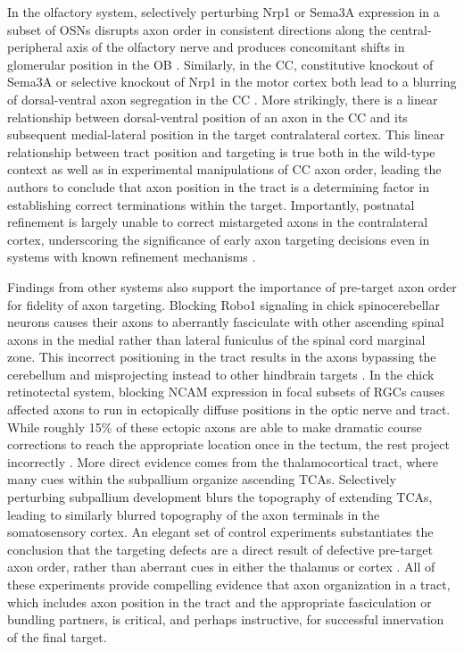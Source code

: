 In the olfactory system, selectively perturbing Nrp1 or Sema3A expression in a subset of OSNs disrupts axon order in consistent directions along the central-peripheral axis of the olfactory nerve and produces concomitant shifts in glomerular position in the OB \cite{imai2009pre}.
Similarly, in the CC, constitutive knockout of Sema3A or selective knockout of Nrp1 in the motor cortex both lead to a blurring of dorsal-ventral axon segregation in the CC \cite{zhou2013axon}.
More strikingly, there is a linear relationship between dorsal-ventral position of an axon in the CC and its subsequent medial-lateral position in the target contralateral cortex.
This linear relationship between tract position and targeting is true both in the wild-type context as well as in experimental manipulations of CC axon order, leading the authors to conclude that axon position in the tract is a determining factor in establishing correct terminations within the target.
Importantly, postnatal refinement is largely unable to correct mistargeted axons in the contralateral cortex, underscoring the significance of early axon targeting decisions even in systems with known refinement mechanisms  \cite{zhou2013axon}.

Findings from other systems also support the importance of pre-target axon order for fidelity of axon targeting.
Blocking Robo1 signaling in chick spinocerebellar neurons causes their axons to aberrantly fasciculate with other ascending spinal axons in the medial rather than lateral funiculus of the spinal cord marginal zone.
This incorrect positioning in the tract results in the axons bypassing the cerebellum and misprojecting instead to other hindbrain targets \cite{sakai2012axon}.
In the chick retinotectal system, blocking NCAM expression in focal subsets of RGCs causes affected axons to run in ectopically diffuse positions in the optic nerve and tract.
While roughly 15\% of these ectopic axons are able to make dramatic course corrections to reach the appropriate location once in the tectum, the rest project incorrectly \cite{thanos1984fiber}.
More direct evidence comes from the thalamocortical tract, where many cues within the subpallium organize ascending TCAs.
Selectively perturbing subpallium development blurs the topography of extending TCAs, leading to similarly blurred topography of the axon terminals in the somatosensory cortex.
An elegant set of control experiments substantiates the conclusion that the targeting defects are a direct result of defective pre-target axon order, rather than aberrant cues in either the thalamus or cortex \cite{lokmane2013sensory}.
All of these experiments provide compelling evidence that axon organization in a tract, which includes axon position in the tract and the appropriate fasciculation or bundling partners, is critical, and perhaps instructive, for successful innervation of the final target.

